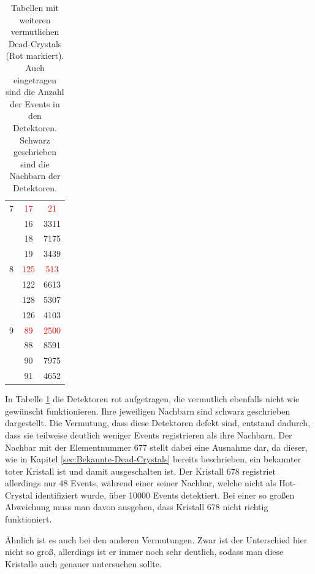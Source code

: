 \documentclass[a4paper,11pt,oneside,final,german,openbib,pdftex]{scrbook}
\begin{document}
{\begin{table}[h!]
\begin{center}
\begin{tabular}{|l|c|c|}
 	\hline
 	\hline
 	7& \textcolor{red}{17} &\textcolor{red}{21} \\
 	\cline{2-3}
 	& 16 & 3311\\
 	\cline{2-3}
 	& 18& 7175 \\
 	\cline{2-3}
 	 & 19& 3439 \\
 	\hline
 	\hline
 	
 	8 & \textcolor{red}{125} &\textcolor{red}{513} \\
 	\cline{2-3}
 	
 	 & 122& 6613\\
 	\cline{2-3}
 	 & 128 & 5307 \\
 	\cline{2-3}
 	& 126 & 4103 \\
 	\hline
 	\hline
 	
 	9 & \textcolor{red}{89}& \textcolor{red}{2500}\\
 	\cline{2-3}
 	& 88& 8591\\
 	\cline{2-3}
 	&90&7975 \\
 	\cline{2-3}
 	&91&4652 \\
 	\hline
 	
 	
 	\end{tabular}
 \caption[Vermutete Dead-Crystals und ihre Nachbarn mit Anzahl ihrer Events]{Tabellen mit weiteren vermutlichen Dead-Crystals (Rot markiert). Auch eingetragen sind die Anzahl der Events in den Detektoren. Schwarz geschrieben sind die Nachbarn der Detektoren.}
\label{tab:Vermutete-Dead-Crystals} 
\end{center}
 \end{table}
 
 In Tabelle \ref{tab:Vermutete-Dead-Crystals} die Detektoren rot aufgetragen, die vermutlich ebenfalls nicht wie gew\"unscht funktionieren. Ihre jeweiligen Nachbarn sind schwarz geschrieben dargestellt. Die Vermutung, dass diese Detektoren defekt sind, entstand dadurch, dass sie teilweise deutlich weniger Events registrieren als ihre Nachbarn. Der Nachbar mit der Elementnummer 677 stellt dabei eine Ausnahme dar, da dieser, wie in Kapitel \ref{sec:Bekannte-Dead-Crystals} bereits beschrieben, ein bekannter toter Kristall ist und damit ausgeschalten ist. Der Kristall 678 registriet allerdings nur 48 Events, w\"ahrend einer seiner Nachbar, welche nicht als Hot-Crystal identifiziert wurde, \"uber 10000 Events detektiert. Bei einer so gro{\ss}en Abweichung muss man davon ausgehen, dass Kristall 678 nicht richtig funktioniert.  
 
 \"Ahnlich ist es auch bei den anderen Vermutungen. Zwar ist der Unterschied hier nicht so gro{\ss}, allerdings ist er immer noch sehr deutlich, sodass man diese Kristalle auch genauer untersuchen sollte.
 \newpage

}
\end{document}

